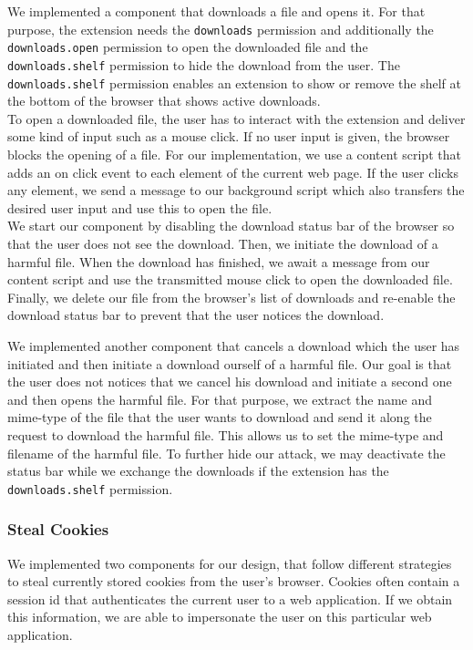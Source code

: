 	We implemented a component that downloads a file and opens it. For that purpose, the extension needs the \texttt{downloads} permission and additionally the \texttt{downloads.open} permission to open the downloaded file and the \texttt{downloads.shelf} permission to hide the download from the user. The \texttt{downloads.shelf} permission enables an extension to show or remove the shelf at the bottom of the browser that shows active downloads. \\
	To open a downloaded file, the user has to interact with the extension and deliver some kind of input such as a mouse click. If no user input is given, the browser blocks the opening of a file. For our implementation, we use a content script that adds an on click event to each element of the current web page. If the user clicks any element, we send a message to our background script which also transfers the desired user input and use this to open the file. \\
	We start our component by disabling the download status bar of the browser so that the user does not see the download. Then, we initiate the download of a harmful file. When the download has finished, we await a message from our content script and use the transmitted mouse click to open the downloaded file. Finally, we delete our file from the browser's list of downloads and re-enable the download status bar to prevent that the user notices the download.
	
	We implemented another component that cancels a download which the user has initiated and then initiate a download ourself of a harmful file. Our goal is that the user does not notices that we cancel his download and initiate a second one and then opens the harmful file. For that purpose, we extract the name and mime-type of the file that the user wants to download and send it along the request to download the harmful file. This allows us to set the mime-type and filename of the harmful file. To further hide our attack, we may deactivate the status bar while we exchange the downloads if the extension has the \texttt{downloads.shelf} permission. \\

\subsubsection{Steal Cookies}
\label{sec:stealCookies}

	We implemented two components for our design, that follow different strategies to steal currently stored cookies from the user's browser. Cookies often contain a session id that authenticates the current user to a web application. If we obtain this information, we are able to impersonate the user on this particular web application. 
	
